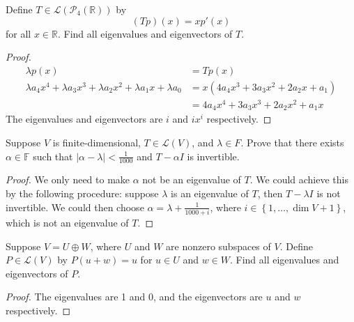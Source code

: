 \newpage
\begin{exercise}
Define $T \in \mathcal{L}(\mathcal{P}_4(\mathbb{R}))$ by \[
	(Tp)(x) = x p'(x)\]
for all $x \in \mathbb{R}$. Find all eigenvalues and eigenvectors of $T$.
\end{exercise}
\begin{proof}
	\begin{align*}
		\lambda p(x) & = Tp(x)                            \\
		\lambda a_4x^4 + \lambda a_3x^{3} + \lambda a_2x^{2} + \lambda a_1 x + \lambda a_0
		             & = x (4a_4  x^3+3a_3x^2+2a_2 x+a_1) \\
		             & = 4a_4 x^4+3a_3x^3+2a_2 x^2+a_1 x
	\end{align*}
	The eigenvalues and eigenvectors are $i$ and $ix^i$ respectively.
\end{proof}

\begin{exercise}
Suppose $V$ is finite-dimensional, $T \in \mathcal{L}(V)$, and $\lambda \in F$. Prove that there exists $\alpha \in \mathbb{F}$ such that $\left\vert \alpha - \lambda \right\vert < \frac{1}{1000}$ and $T - \alpha I$ is invertible.
\end{exercise}
\begin{proof}
	We only need to make $\alpha$ not be an eigenvalue of $T$. We could achieve this by the following procedure:
	suppose $\lambda$ is an eigenvalue of $T$, then $T - \lambda I$ is not invertible. We could then choose $\alpha = \lambda + \frac{1}{1000 + i}$, where $i \in \left\{1, \ldots ,\operatorname{dim}V + 1\right\}$, which is not an eigenvalue of $T$.
\end{proof}

\begin{exercise}
Suppose $V = U \oplus W$, where $U$ and $W$ are nonzero subspaces of $V$. Define $P \in \mathcal{L}(V)$ by $P(u + w) = u$ for $u \in U$ and $w \in W$. Find all eigenvalues and eigenvectors of $P$.
\end{exercise}
\begin{proof}
	The eigenvalues are 1 and 0, and the eigenvectors are $u$ and $w$ respectively.
\end{proof}

